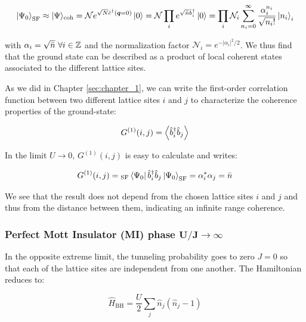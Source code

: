 \begin{equation}
    \ket{\Psi_0}_{\mathrm{SF}} \approx |\Psi\rangle_{\mathrm{coh}}=\mathcal{N} e^{\sqrt{N} \hat{c}^{\dagger}(\bm{q}=0)} \ket{0} = \mathcal{N} \prod_{i} e^{\sqrt{\bar{n}} \hat{b}_{i}^{\dagger}} \ket{0} = \prod_{i} \mathcal{N}_{i} \sum_{n_{i}=0}^{\infty} \frac{\alpha_{i}^{n_{i}}}{\sqrt{n_{i} !}}\left|n_{i}\right\rangle_{i}
    \label{eq:ground-state_superfluid}
\end{equation}

\noindent with $\alpha_i=\sqrt{\bar{n}} \ \forall i \in \mathbb{Z}$ and the normalization factor $\mathcal{N}_{i}=e^{-\left|\alpha_{i}\right|^{2} / 2}$. We thus find that the ground state can be described as a product of local coherent states associated to the different lattice sites.

As we did in Chapter \ref{sec:chapter_1}, we can write the first-order correlation function between two different lattice sites $i$ and $j$ to characterize the coherence properties of the ground-state:

\begin{equation}
    G^{(1)}(i,j)= \left\langle\hat{b}^{\dagger}_i \hat{b}_j\right\rangle
\end{equation}

\noindent In the limit $U \to 0$, $G^{(1)}(i,j)$ is easy to calculate and writes:

\begin{equation}
    G^{(1)}(i,j)= {}_{\mathrm{SF}} \bra{\Psi_0} \hat{b}^{\dagger}_i \hat{b}_j \ket{\Psi_0}_{\mathrm{SF}} = \alpha^*_i \alpha_j = \bar{n}
\end{equation}

We see that the result does not depend from the chosen lattice sites $i$ and $j$ and thus from the distance between them, indicating an infinite range coherence.


\subsubsection{Perfect Mott Insulator (MI) phase $\bm{U/J \to \infty}$}

In the opposite extreme limit, the tunneling probability goes to zero $J=0$ so that each of the lattice sites are independent from one another. The Hamiltonian reduces to:

\begin{equation}
    \hat{H}_{\mathrm{BH}} = \frac{U}{2} \sum_j \hat{n}_j (\hat{n}_j -1)
\end{equation}

